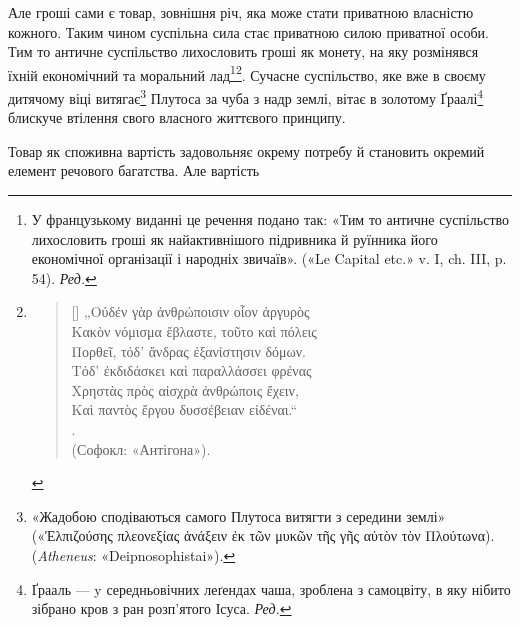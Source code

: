 Але гроші сами є товар, зовнішня річ, яка може стати приватною
власністю кожного. Таким чином суспільна сила стає приватною
силою приватної особи. Тим то античне суспільство лихословить
гроші як монету, на яку розмінявся їхній економічний та моральний
лад\footnote*{
У французькому виданні це речення подано так: «Тим то
античне суспільство лихословить гроші як найактивнішого підривника й руїнника
його економічної організації і народніх звичаїв». («Le Capital etc.» v. I,
ch. III, p. 54). \emph{Ред.}
}\footnote{
\settowidth{\versewidth}{В усякій справі путь показує безбожну].}
\begin{verse}[\versewidth]
\vspace{-\dimexpr\baselineskip+\topsep}
\textgreek{„Οὐδέν γὰρ ἀνθρώποισιν οἷον ἀργυρὸς \\
Κακὸν νόμισμα ἔβλαστε, τοῦτο καὶ πόλεις \\
Πορθεῖ, τόδ' ἄνδρας ἐξανίστησιν δόμων. \\
Τόδ’ ἐκδιδάσκει καὶ παραλλάσσει φρένας \\
Χρηστὰς πρὸς αἰσχρὰ ἀνθρώποις ἔχειν, \\
Καὶ παντὸς ἔργου δυσσέβειαν εἰδέναι.“} \\
. \\
\smallskip
(Софокл: «Антігона»).
\end{verse}
}. Сучасне суспільство, яке вже в своєму дитячому
віці витягає\footnote{
«Жадобою сподіваються самого Плутоса витягти з середини землі»
(«\textgreek{Ἐλπιζούσης  πλεονεξίας ἀνάξειν ἐκ τῶν μυκῶν τῆς γῆς αὐτὸν τὸν Πλούτωνα}). (\emph{Atheneus}:
«Deipnosophistai»).
} Плутоса за чуба з надр землі, вітає в золотому
Ґраалі\footnote*{
Ґрааль — y середньовічних леґендах чаша, зроблена з самоцвіту,
в яку нібито зібрано кров з ран розп’ятого Ісуса. \emph{Ред.}
} блискуче втілення свого власного життєвого принципу.

Товар як споживна вартість задовольняє окрему потребу й
становить окремий елемент речового багатства. Але вартість
\parbreak{}  %
